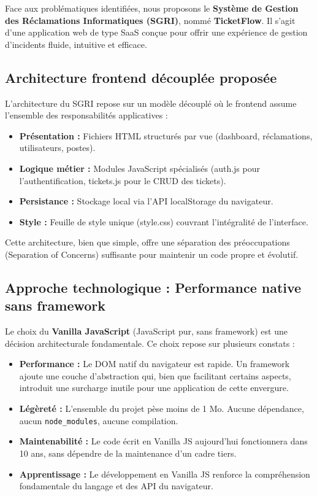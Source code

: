 \documentclass[12pt,a4paper,twoside]{report}
\begin{document}
Face aux problématiques identifiées, nous proposons le \textbf{Système de Gestion des Réclamations Informatiques (SGRI)}, nommé \textbf{TicketFlow}. Il s'agit d'une application web de type SaaS conçue pour offrir une expérience de gestion d'incidents fluide, intuitive et efficace.

\subsection{Architecture frontend découplée proposée}

L'architecture du SGRI repose sur un modèle découplé où le frontend assume l'ensemble des responsabilités applicatives :

\begin{itemize}
    \item \textbf{Présentation :} Fichiers HTML structurés par vue (dashboard, réclamations, utilisateurs, postes).
    \item \textbf{Logique métier :} Modules JavaScript spécialisés (auth.js pour l'authentification, tickets.js pour le CRUD des tickets).
    \item \textbf{Persistance :} Stockage local via l'API localStorage du navigateur.
    \item \textbf{Style :} Feuille de style unique (style.css) couvrant l'intégralité de l'interface.
\end{itemize}

Cette architecture, bien que simple, offre une séparation des préoccupations (Separation of Concerns) suffisante pour maintenir un code propre et évolutif.

\subsection{Approche technologique : Performance native sans framework}

Le choix du \textbf{Vanilla JavaScript} (JavaScript pur, sans framework) est une décision architecturale fondamentale. Ce choix repose sur plusieurs constats :

\begin{itemize}
    \item \textbf{Performance :} Le DOM natif du navigateur est rapide. Un framework ajoute une couche d'abstraction qui, bien que facilitant certains aspects, introduit une surcharge inutile pour une application de cette envergure.
    \item \textbf{Légèreté :} L'ensemble du projet pèse moins de 1 Mo. Aucune dépendance, aucun \texttt{node\_modules}, aucune compilation.
    \item \textbf{Maintenabilité :} Le code écrit en Vanilla JS aujourd'hui fonctionnera dans 10 ans, sans dépendre de la maintenance d'un cadre tiers.
    \item \textbf{Apprentissage :} Le développement en Vanilla JS renforce la compréhension fondamentale du langage et des API du navigateur.
\end{itemize}
\end{document}
